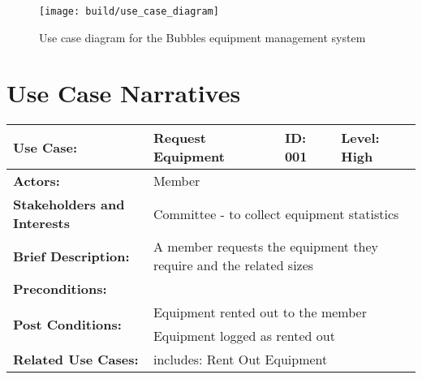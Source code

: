 \documentclass[12pt,a4paper]{article}
\begin{document}
\begin{figure}[h!]
  \centering
  \texttt{[image: build/use\_case\_diagram]}
  \caption{Use case diagram for the Bubbles equipment management system}
  \label{fig:UseCaseDiagram}
\end{figure}

\section{Use Case Narratives}
\begin{tabular}{|p{}|p{}|p{}|p{}|}
  \hline
  \textbf{Use Case:} & Request Equipment & \textbf{ID:} 001 & \textbf{Level:} High
  \\\hline
  \textbf{Actors:} & \multicolumn{3}{|l|}{Member} \\\hline
  \textbf{Stakeholders and Interests} &
  \multicolumn{3}{|p{0.79\textwidth}|}{
    Committee - to collect equipment statistics
  } \\\hline
  \textbf{Brief Description:} & \multicolumn{3}{|p{0.79\textwidth}|}{
    A member requests the equipment they require and the related sizes} \\\hline
  \textbf{Preconditions:}
  & \multicolumn{3}{|p{0.79\textwidth}|}{} \\\hline
  \multirow{2}{0.2\textwidth}{\textbf{Post Conditions:}}
  & \multicolumn{3}{|p{0.79\textwidth}|}{Equipment rented out to the member} \\
  & \multicolumn{3}{|p{0.79\textwidth}|}{
    Equipment logged as rented out} \\\hline
  \textbf{Related Use Cases:}
  & \multicolumn{3}{|p{0.79\textwidth}|}{includes: Rent Out Equipment} \\\hline
\end{tabular}
\end{document}
